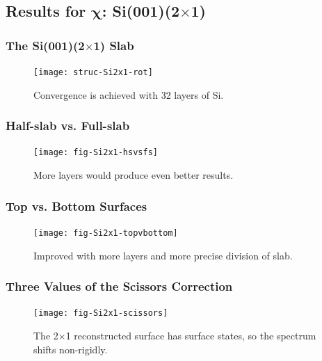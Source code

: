 \documentclass{beamer}
\begin{document}



\subsection{Results for \texorpdfstring{$\boldsymbol{\chi}$}{X}:
\texorpdfstring{Si(001)(2$\times$1)}{Si(001)(2x1)}}

\begin{frame}
\frametitle{The Si(001)(2$\times$1) Slab}
\begin{figure}
\centering
\texttt{[image: struc-Si2x1-rot]}
\vspace*{-0.4cm}
\caption{Convergence is achieved with 32 layers of Si.}
\end{figure}
\end{frame}

\begin{frame}
\frametitle{Half-slab vs. Full-slab}
\begin{figure}
\centering
\texttt{[image: fig-Si2x1-hsvsfs]}
\caption{More layers would produce even better results.}
\end{figure}
\end{frame}

\begin{frame}
\frametitle{Top vs. Bottom Surfaces}
\begin{figure}
\centering
\texttt{[image: fig-Si2x1-topvbottom]}
\caption{Improved with more layers and more precise division of slab.}
\end{figure}
\end{frame}

\begin{frame}
\frametitle{Three Values of the Scissors Correction}
\begin{figure}
\centering
\texttt{[image: fig-Si2x1-scissors]}
\caption{The 2$\times$1 reconstructed surface has surface states, so the
spectrum shifts non-rigidly.}
\end{figure}
\end{frame}
\end{document}
